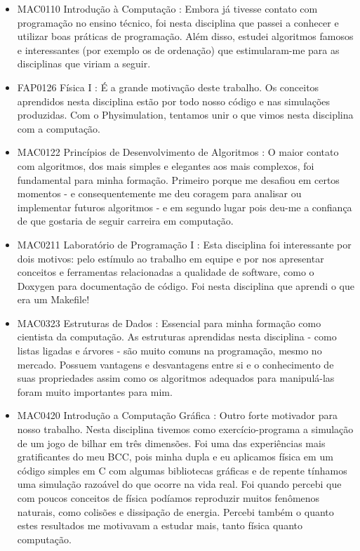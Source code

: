 \begin{itemize}

\item MAC0110   Introdução à Computação : Embora já tivesse contato com programação no ensino técnico, foi nesta disciplina que passei a conhecer e utilizar boas práticas de programação. Além disso, estudei algoritmos famosos e interessantes (por exemplo os de ordenação) que estimularam-me para as disciplinas que viriam a seguir.

\item FAP0126 	Física I : É a grande motivação deste trabalho. Os conceitos aprendidos nesta disciplina estão por todo nosso código e nas simulações produzidas. Com o Physimulation, tentamos unir o que vimos nesta disciplina com a computação.
 
\item MAC0122 	Princípios de Desenvolvimento de Algoritmos : O maior contato com algoritmos, dos mais simples e elegantes aos mais complexos, foi fundamental para minha formação. Primeiro porque me desafiou em certos momentos - e consequentemente me deu coragem para analisar ou implementar futuros algoritmos - e em segundo lugar pois deu-me a confiança de que gostaria de seguir carreira em computação.
 
\item MAC0211 	Laboratório de Programação I : Esta disciplina foi interessante por dois motivos: pelo estímulo ao trabalho em equipe e por nos apresentar conceitos e ferramentas relacionadas a qualidade de software, como o Doxygen para documentação de código. Foi nesta disciplina que aprendi o que era um Makefile!

\item MAC0323 	Estruturas de Dados : Essencial para minha formação como cientista da computação. As estruturas aprendidas nesta disciplina - como listas ligadas e árvores - são muito comuns na programação, mesmo no mercado. Possuem vantagens e desvantagens entre si e o conhecimento de suas propriedades assim como os algoritmos adequados para manipulá-las foram muito importantes para mim.

\item MAC0420 	Introdução a Computação Gráfica : Outro forte motivador para nosso trabalho. Nesta disciplina tivemos como exercício-programa a simulação de um jogo de bilhar em três dimensões. Foi uma das experiências mais gratificantes do meu BCC, pois minha dupla e eu aplicamos física em um código simples em C com algumas bibliotecas gráficas e de repente tínhamos uma simulação razoável do que ocorre na vida real. Foi quando percebi que com poucos conceitos de física podíamos reproduzir muitos fenômenos naturais, como colisões e dissipação de energia. Percebi também o quanto estes resultados me motivavam a estudar mais, tanto física quanto computação.


\end{itemize}
